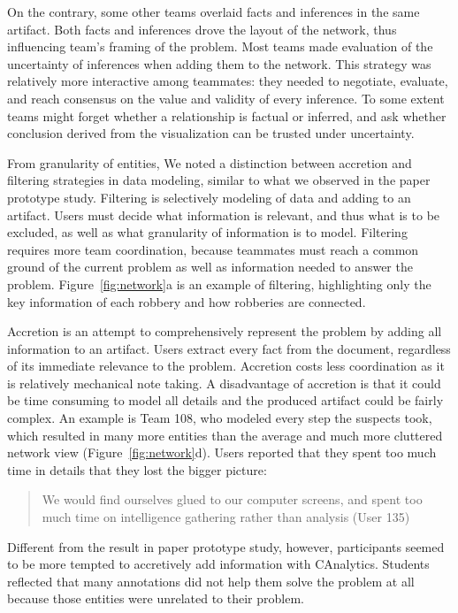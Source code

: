On the contrary, some other teams overlaid facts and inferences in the
same artifact. Both facts and inferences drove the layout of the
network, thus influencing team's framing of the problem. Most teams made
evaluation of the uncertainty of inferences when adding them to the
network. This strategy was relatively more interactive among teammates:
they needed to negotiate, evaluate, and reach consensus on the value and
validity of every inference. To some extent teams might forget whether a
relationship is factual or inferred, and ask whether conclusion derived
from the visualization can be trusted under uncertainty.

From granularity of entities, We noted a distinction between accretion
and filtering strategies in data modeling, similar to what we observed
in the paper prototype study. Filtering is selectively modeling of data
and adding to an artifact. Users must decide what information is
relevant, and thus what is to be excluded, as well as what granularity
of information is to model. Filtering requires more team coordination,
because teammates must reach a common ground of the current problem as
well as information needed to answer the problem. Figure~\ref{fig:network}a is an example of filtering, highlighting only
the key information of each robbery and how robberies are connected.

Accretion is an attempt to comprehensively represent the problem by
adding all information to an artifact. Users extract every fact from the
document, regardless of its immediate relevance to the problem.
Accretion costs less coordination as it is relatively mechanical note
taking. A disadvantage of accretion is that it could be time consuming
to model all details and the produced artifact could be fairly complex.
An example is Team 108, who modeled every step the suspects took, which
resulted in many more entities than the average and much more cluttered
network view (Figure~\ref{fig:network}d). Users reported that they
spent too much time in details that they lost the bigger picture:

\begin{quote}
We would find ourselves glued to our computer screens, and spent too
much time on intelligence gathering rather than analysis (User 135)
\end{quote}

Different from the result in paper prototype study, however,
participants seemed to be more tempted to accretively add information
with CAnalytics. Students reflected that many annotations did not help
them solve the problem at all because those entities were unrelated to
their problem.

